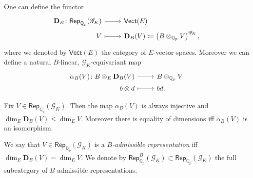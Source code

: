 \begin{defn}[]
	One can define the functor
	\begin{equation*}
	\begin{tikzcd}[row sep = 0ex
		,/tikz/column 1/.append style={anchor=base east}
		,/tikz/column 2/.append style={anchor=base west}]
		\mathbf{D}_B\colon \mathsf{Rep}_{\mathbb{Q}_p}(\mathscr{G}_K) \arrow[r, "", rightarrow] &
		\mathsf{Vect}(E) \\
		V \arrow[r, "", mapsto] & 
		\mathbf{D}_B(V) \coloneqq \left( B \otimes_{\mathbb{Q}_p} V \right)^{\mathscr{G}_K}
	,\end{tikzcd}
	\end{equation*} 
	where we denoted by $\mathsf{Vect}(E)$ the category of $E$-vector spaces.
	Moreover we can define a natural $B$-linear, $\mathscr{G}_K$-equivariant map
	\begin{equation*}
	\begin{tikzcd}[row sep = 0ex
		,/tikz/column 1/.append style={anchor=base east}
		,/tikz/column 2/.append style={anchor=base west}]
		\alpha_B(V)\colon 
		B \otimes_E \mathbf{D}_B(V) \arrow[r, "", rightarrow] &
		B \otimes_{\mathbb{Q}_p} V \\
		b \otimes d
		\arrow[r, "", mapsto] & 
		bd
	.\end{tikzcd}
	\end{equation*}
\end{defn}


\begin{prop}
	Fix $V \in \mathsf{Rep}_{\mathbb{Q}_p}(\mathscr{G}_K)$.
	Then the map $\alpha_B(V)$ is always injective and
	$\dim_E \mathbf{D}_B(V) \leq \dim_E V$.
	Moreover there is equality of dimensions iff $\alpha_B(V)$ is an isomorphism.
\end{prop}


\begin{defn}
	We say that $V \in \mathsf{Rep}_{\mathbb{Q}_p}(\mathscr{G}_K)$ is a
	\emph{$B$-admissible representation} iff 
	$\dim_E \mathbf{D}_B(V) = \dim_E V$.
	We denote by $\mathsf{Rep}_{\mathbb{Q}_p}^B(\mathscr{G}_K) \subset
	\mathsf{Rep}_{\mathbb{Q}_p}(\mathscr{G}_K)$
	the full subcategory of $B$-admissible representations.
\end{defn}


